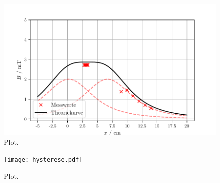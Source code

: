 \begin{figure}
  \centering
  \includegraphics{helmholtzR.pdf}
  \caption{Plot.}
  \label{fig:plot}
\end{figure}

\begin{figure}
  \centering
  \texttt{[image: hysterese.pdf]}
  \caption{Plot.}
  \label{fig:plot}
\end{figure}

